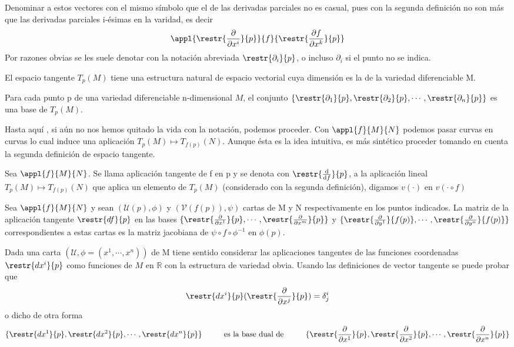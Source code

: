 \documentclass[palatino, bibnumbers]{apuntes}
\begin{document}
Denominar a estos vectores con el mismo símbolo que el de las derivadas parciales no es casual, pues con la segunda definición no son más que las derivadas parciales i-ésimas en la varidad, es decir 
\begin{equation}
\appl{\restr{\pdv{}{x^{i}}}{p}}{f}{\restr{\pdv{f}{x^{k}}}{p}}
\end{equation}
Por razones obvias se les suele denotar con la notación abreviada $\restr{\partial_i}{p}$, o incluso $\partial_i$ si el punto no se indica.
\begin{prop} El espacio tangente $T_p(M)$ tiene una estructura natural de espacio vectorial cuya dimensión es la de la variedad diferenciable M.
\end{prop}
\begin{prop} Para cada punto p de una variedad diferenciable n-dimensional $M$, el conjunto $\{\restr{\partial_1}{p},\restr{\partial_2}{p},\cdots,\restr{\partial_n}{p}\}$ es una base de $T_p(M)$.
\end{prop}
Hasta aquí , si aún no nos hemos quitado la vida con la notación, podemos proceder.
\newpage
Con $\appl{f}{M}{N}$ podemos pasar curvas en curvas lo cual induce una aplicación $T_p(M)\longmapsto T_{f(p)}(N)$. Aunque ésta es la idea intuitiva, es más sintético proceder tomando en cuenta la segunda definición de espacio tangente.

\begin{defn} Sea $\appl{f}{M}{N}$. Se llama aplicación tangente de f en p y se denota con $\restr{\dv{f}}{p}$, a la aplicación lineal $T_p(M)\longmapsto T_{f(p)}(N)$ que aplica un elemento de $T_p(M)$ (considerado con la segunda definición), digamos $v(\cdot)$ en $v(\cdot\circ f)$
\end{defn}
\begin{prop} Sea $\appl{f}{M}{N}$ y sean $(\mathcal{U}(p),\phi)$ y $(\mathcal{V}(f(p)),\psi)$ cartas de M y N respectivamente en los puntos indicados. La matriz de la aplicación tangente $\restr{df}{p}$ en las bases $\{\restr{\pdv{}{x^1}}{p},\cdots,\restr{\pdv{}{x^m}}{p}\}$ y $\{\restr{\pdv{}{y^1}}{f(p)},\cdots,\restr{\pdv{}{y^n}}{f(p)}\}$ correspondientes a estas cartas es la matriz jacobiana de $\psi\circ f\circ\phi^{-1}$ en $\phi(p)$.
\end{prop}

Dada una carta $(\mathcal{U},\phi=(x^1,\cdots,x^n))$ de M tiene sentido considerar las aplicaciones tangentes de las funciones coordenadas $\restr{dx^{i}}{p}$ como funciones de $M$ en $ℝ$ con la estructura de variedad obvia. Usando las definiciones de vector tangente se puede probar que $$\restr{dx^{i}}{p}(\restr{\pdv{}{x^j}}{p})=\delta_j^i$$ o dicho de otra forma $$\{\restr{dx^1}{p},\restr{dx^2}{p},\cdots,\restr{dx^n}{p}\}\tab \text{es la base dual de} \tab\{\restr{\pdv{}{x^1}}{p},\restr{\pdv{}{x^2}}{p},\cdots,\restr{\pdv{}{x^n}}{p}\}$$
\end{document}
